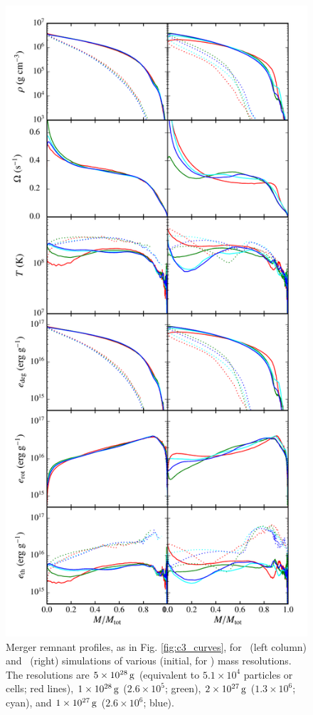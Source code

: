 \begin{figure}
\centering
\includegraphics[angle=0,width=0.6\columnwidth]{chapter3_zhu+u/figures/curves_res.pdf}
\caption{Merger remnant profiles, as in Fig. \ref{fig:c3_curves}, for \gasoline\ (left column) and \arepo\ (right) simulations of various (initial, for \arepo) mass resolutions.  The resolutions are $5\times10^{28}\,\mathrm{g}$ (equivalent to $5.1\times10^4$ particles or cells; red lines), $1\times10^{28}\,\mathrm{g}$ ($2.6\times10^{5}$; green), $2\times10^{27}\,\mathrm{g}$ ($1.3\times10^{6}$; cyan), and $1\times10^{27}\,\mathrm{g}$ ($2.6\times10^{6}$; blue).}
\label{fig:c3_res_curves}
\end{figure}



